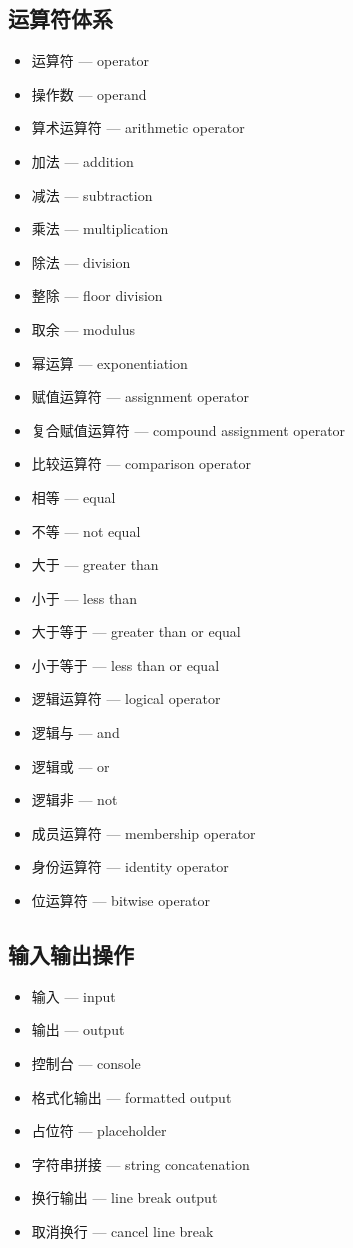 \subsection{运算符体系}
\begin{itemize}
\item 运算符 — operator
\item 操作数 — operand
\item 算术运算符 — arithmetic operator
\item 加法 — addition
\item 减法 — subtraction
\item 乘法 — multiplication
\item 除法 — division
\item 整除 — floor division
\item 取余 — modulus
\item 幂运算 — exponentiation
\item 赋值运算符 — assignment operator
\item 复合赋值运算符 — compound assignment operator
\item 比较运算符 — comparison operator
\item 相等 — equal
\item 不等 — not equal
\item 大于 — greater than
\item 小于 — less than
\item 大于等于 — greater than or equal
\item 小于等于 — less than or equal
\item 逻辑运算符 — logical operator
\item 逻辑与 — and
\item 逻辑或 — or
\item 逻辑非 — not
\item 成员运算符 — membership operator
\item 身份运算符 — identity operator
\item 位运算符 — bitwise operator
\end{itemize}

\subsection{输入输出操作}
\begin{itemize}
\item 输入 — input
\item 输出 — output
\item 控制台 — console
\item 格式化输出 — formatted output
\item 占位符 — placeholder
\item 字符串拼接 — string concatenation
\item 换行输出 — line break output
\item 取消换行 — cancel line break
\end{itemize}

